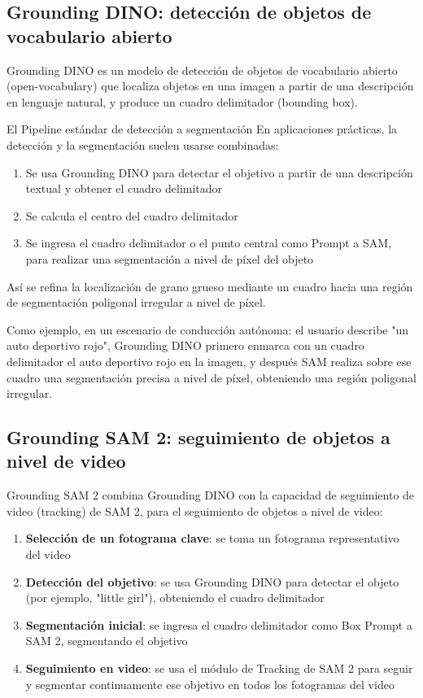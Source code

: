 \documentclass[a4paper]{article}
\begin{document}
\subsection{Grounding DINO: detección de objetos de vocabulario abierto}

Grounding DINO es un modelo de detección de objetos de vocabulario abierto (open-vocabulary) que localiza objetos en una imagen a partir de una descripción en lenguaje natural, y produce un cuadro delimitador (bounding box).

\begin{importantbox}{El Pipeline estándar de detección a segmentación}
En aplicaciones prácticas, la detección y la segmentación suelen usarse combinadas:
\begin{enumerate}
    \item Se usa Grounding DINO para detectar el objetivo a partir de una descripción textual y obtener el cuadro delimitador
    \item Se calcula el centro del cuadro delimitador
    \item Se ingresa el cuadro delimitador o el punto central como Prompt a SAM, para realizar una segmentación a nivel de píxel del objeto
\end{enumerate}
Así se refina la localización de grano grueso mediante un cuadro hacia una región de segmentación poligonal irregular a nivel de píxel.
\end{importantbox}

Como ejemplo, en un escenario de conducción autónoma: el usuario describe "un auto deportivo rojo", Grounding DINO primero enmarca con un cuadro delimitador el auto deportivo rojo en la imagen, y después SAM realiza sobre ese cuadro una segmentación precisa a nivel de píxel, obteniendo una región poligonal irregular.

\subsection{Grounding SAM 2: seguimiento de objetos a nivel de video}

Grounding SAM 2 combina Grounding DINO con la capacidad de seguimiento de video (tracking) de SAM 2, para el seguimiento de objetos a nivel de video:

\begin{enumerate}
    \item \textbf{Selección de un fotograma clave}: se toma un fotograma representativo del video
    \item \textbf{Detección del objetivo}: se usa Grounding DINO para detectar el objeto (por ejemplo, "little girl"), obteniendo el cuadro delimitador
    \item \textbf{Segmentación inicial}: se ingresa el cuadro delimitador como Box Prompt a SAM 2, segmentando el objetivo
    \item \textbf{Seguimiento en video}: se usa el módulo de Tracking de SAM 2 para seguir y segmentar continuamente ese objetivo en todos los fotogramas del video
\end{enumerate}
\end{document}
